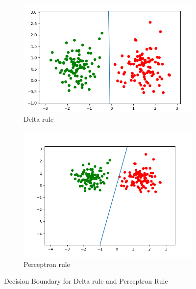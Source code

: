\documentclass[a4paper]{article}
\begin{document}
\begin{figure}[htb]
    \centering
    \begin{subfigure}{0.4\textwidth}
        \includegraphics[width=\textwidth]{Labs/Lab 1/Lab 1a/Results/Delta-linear-seperable.png}
        \caption{Delta rule}
        \label{fig:Delta Rule}
    \end{subfigure}
    \hfill
    \begin{subfigure}{0.4\textwidth}
        \includegraphics[width=\textwidth]{Labs/Lab 1/Lab 1a/Results/perceptron-linearly-seperable.png}
        \caption{Perceptron rule}
        \label{fig:Perceptron}
    \end{subfigure}
    \caption{Decision Boundary for Delta rule and Perceptron Rule}
    \label{fig:Decision Boundary}
\end{figure}\\
\end{document}
